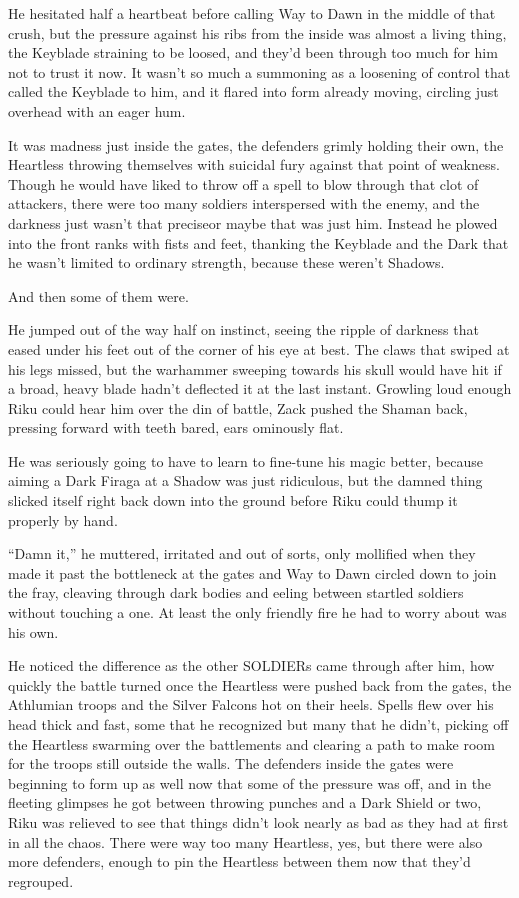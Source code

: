 He hesitated half a heartbeat before calling Way to Dawn in the middle of that crush, but the pressure against his ribs from the inside was almost a living thing, the Keyblade straining to be loosed, and they'd been through too much for him not to trust it now. It wasn't so much a summoning as a loosening of control that called the Keyblade to him, and it flared into form already moving, circling just overhead with an eager hum.

It was madness just inside the gates, the defenders grimly holding their own, the Heartless throwing themselves with suicidal fury against that point of weakness. Though he would have liked to throw off a spell to blow through that clot of attackers, there were too many soldiers interspersed with the enemy, and the darkness just wasn't that precise\textemdash or maybe that was just him. Instead he plowed into the front ranks with fists and feet, thanking the Keyblade and the Dark that he wasn't limited to ordinary strength, because these weren't Shadows.

And then some of them were.

He jumped out of the way half on instinct, seeing the ripple of darkness that eased under his feet out of the corner of his eye at best. The claws that swiped at his legs missed, but the warhammer sweeping towards his skull would have hit if a broad, heavy blade hadn't deflected it at the last instant. Growling loud enough Riku could hear him over the din of battle, Zack pushed the Shaman back, pressing forward with teeth bared, ears ominously flat.

He was seriously going to have to learn to fine-tune his magic better, because aiming a Dark Firaga at a Shadow was just ridiculous, but the damned thing slicked itself right back down into the ground before Riku could thump it properly by hand.

``Damn it,'' he muttered, irritated and out of sorts, only mollified when they made it past the bottleneck at the gates and Way to Dawn circled down to join the fray, cleaving through dark bodies and eeling between startled soldiers without touching a one. At least the only friendly fire he had to worry about was his own.

He noticed the difference as the other SOLDIERs came through after him, how quickly the battle turned once the Heartless were pushed back from the gates, the Athlumian troops and the Silver Falcons hot on their heels. Spells flew over his head thick and fast, some that he recognized but many that he didn't, picking off the Heartless swarming over the battlements and clearing a path to make room for the troops still outside the walls. The defenders inside the gates were beginning to form up as well now that some of the pressure was off, and in the fleeting glimpses he got between throwing punches and a Dark Shield or two, Riku was relieved to see that things didn't look nearly as bad as they had at first in all the chaos. There were way too many Heartless, yes, but there were also more defenders, enough to pin the Heartless between them now that they'd regrouped.

